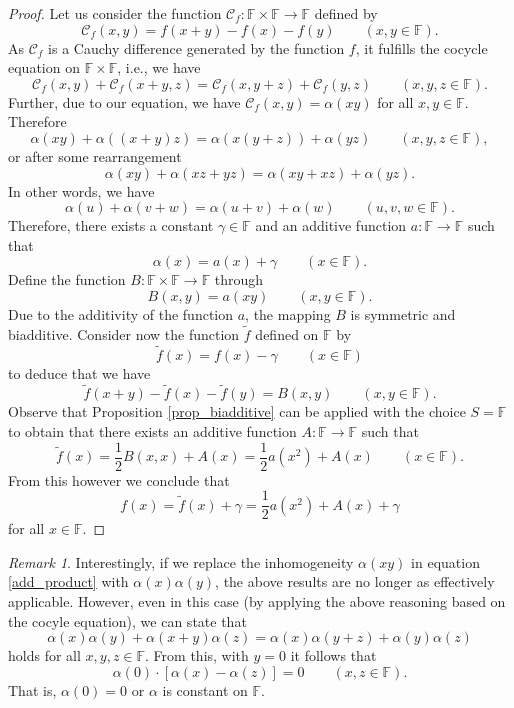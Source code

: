 \documentclass[a4paper,12pt]{article}
\theoremstyle{plain}
\theoremstyle{definition}
\theoremstyle{remark}
\newtheorem*{rem}{Remark}
\begin{document}
\begin{proof}
 Let us consider the function $\mathscr{C}_{f}\colon \mathbb{F}\times \mathbb{F}\to \mathbb{F}$ defined by 
 \[
\mathscr{C}_{f}(x, y)= f(x+y)-f(x)-f(y)  
\qquad 
\left(x, y\in \mathbb{F}\right). 
 \]
 As $\mathscr{C}_{f}$ is a Cauchy difference generated by the function $f$, it fulfills the cocycle equation on $\mathbb{F}\times \mathbb{F}$, i.e., we have 
 \[
  \mathscr{C}_{f}(x, y)+\mathscr{C}_{f}(x+y, z)= \mathscr{C}_{f}(x, y+z)+\mathscr{C}_{f}(y, z) 
  \qquad 
  \left(x, y, z\in \mathbb{F}\right). 
 \]
 Further, due to our equation, we have $\mathscr{C}_{f}(x, y)= \alpha(xy)$ for all $x, y\in \mathbb{F}$. Therefore 
 \[
  \alpha(xy)+\alpha((x+y)z)= \alpha(x(y+z))+\alpha(yz) 
  \qquad 
  \left(x, y, z\in \mathbb{F}\right), 
 \]
or after some rearrangement 
\[
 \alpha(xy)+\alpha(xz+yz)= \alpha(xy+xz)+\alpha(yz). 
\]
In other words, we have 
\[
 \alpha(u)+\alpha(v+w)= \alpha(u+v)+\alpha(w) 
 \qquad 
 \left(u, v, w\in \mathbb{F}\right). 
\]
Therefore, there exists a constant $\gamma\in \mathbb{F}$ and an additive function $a\colon \mathbb{F}\to \mathbb{F}$ such that 
\[
 \alpha(x)= a(x)+\gamma 
 \qquad 
 \left(x\in \mathbb{F}\right). 
\]
Define the function $B\colon \mathbb{F}\times \mathbb{F}\to \mathbb{F}$ through 
\[
 B(x, y)= a (xy) 
 \qquad 
 \left(x, y\in \mathbb{F}\right). 
\]
Due to the additivity of the function $a$, the mapping $B$ is symmetric and biadditive. Consider now the function $\tilde{f}$ defined on $\mathbb{F}$ by 
\[
 \tilde{f}(x)= f(x)-\gamma 
 \qquad 
 \left(x\in \mathbb{F}\right)
\]
to deduce that we have 
\[
 \tilde{f}(x+y)-\tilde{f}(x)-\tilde{f}(y)= B(x, y) 
 \qquad 
 \left(x, y\in \mathbb{F}\right). 
\]
Observe that Proposition \ref{prop_biadditive} can be applied with the choice $S=\mathbb{F}$ to obtain that there exists an additive function $A\colon \mathbb{F}\to \mathbb{F}$ such that 
\[
 \tilde{f}(x)= \frac{1}{2}B(x, x)+A(x)=
 \frac{1}{2} a(x^{2})+A(x) 
 \qquad 
 \left(x\in \mathbb{F}\right).
\]
From this however we conclude that 
\[
 f(x)= \tilde{f}(x)+\gamma= \frac{1}{2} a(x^{2})+A(x)+\gamma
\]
for all $x\in \mathbb{F}$. 
\end{proof}




\begin{rem}
Interestingly, if we replace the inhomogeneity $\alpha(xy)$ in equation \eqref{add_product} with $\alpha(x)\alpha(y)$, the above results are no longer as effectively applicable. 
However, even in this case (by applying the above reasoning based on the cocyle equation), we can state that 
\[
 \alpha(x)\alpha(y)+\alpha(x+y)\alpha(z)= \alpha(x)\alpha(y+z)+\alpha(y)\alpha(z)
\]
holds for all $x, y, z\in \mathbb{F}$. 
From this, with $y=0$ it follows that 
\[
 \alpha(0)\cdot \left[\alpha(x)-\alpha(z)\right]=0 
 \qquad 
 \left(x, z\in \mathbb{F}\right). 
\]
That is, 
$\alpha(0)=0$ or $\alpha$ is constant on $\mathbb{F}$. 
\end{rem}
\end{document}
